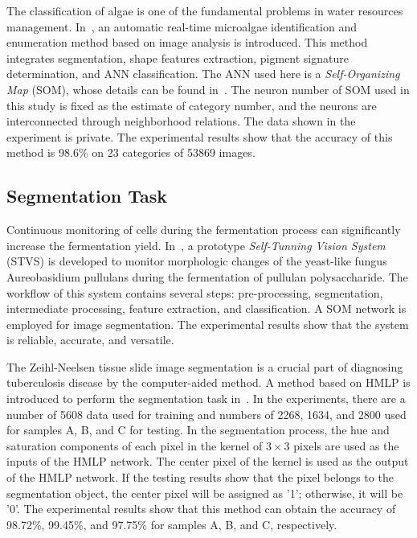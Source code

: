 The classification of algae is one of the fundamental problems in water resources management. In~\cite{Coltelli-2014-WMAR}, an automatic real-time microalgae identification and enumeration method based on image analysis is introduced. This method integrates segmentation, shape features extraction, pigment signature determination, and ANN classification. The ANN used here is a \emph{Self-Organizing Map} (SOM), whose details can be found in~\cite{Rissino-2009-RSTC,Sap-2008-HSOM,Silva-2007-AHPS}. The neuron number of SOM used in this study is fixed as the estimate of category number, and the neurons are interconnected through neighborhood relations. The data shown in the experiment is private. The experimental results show that the accuracy of this method is 98.6\% on 23 categories of 53869 images. 



\subsection{Segmentation Task}
Continuous monitoring of cells during the fermentation process can significantly increase the fermentation yield. In~\cite{Shabtai-1996-MMMC}, a prototype \emph{Self-Tunning Vision System} (STVS) is developed to monitor morphologic changes of the yeast-like fungus Aureobasidium pullulans during the fermentation of pullulan polysaccharide. The workflow of this system contains several steps: pre-processing, segmentation, intermediate processing, feature extraction, and classification. A SOM network is employed for image segmentation. The experimental results show that the system is reliable, accurate, and versatile.

The Zeihl-Neelsen tissue slide image segmentation is a crucial part of diagnosing tuberculosis disease by the computer-aided method. A method based on HMLP is introduced to perform the segmentation task in~\cite{Osman-2010-STBZ}. In the experiments, there are a number of 5608 data used for training and numbers of 2268, 1634, and 2800 used for samples A, B, and C for testing. In the segmentation process, the hue and saturation components of each pixel in the kernel of $3\times3$ pixels are used as the inputs of the HMLP network. The center pixel of the kernel is used as the output of the HMLP network. If the testing results show that the pixel belongs to the segmentation object, the center pixel will be assigned as '1'; otherwise, it will be '0'. The experimental results show that this method can obtain the accuracy of 98.72\%, 99.45\%, and 97.75\% for samples A, B, and C, respectively.


